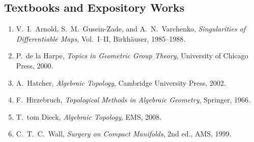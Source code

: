 \subsection*{Textbooks and Expository Works}
\begin{enumerate}
    \item V.\ I.\ Arnold, S.\ M.\ Gusein-Zade, and A.\ N.\ Varchenko, \textit{Singularities of Differentiable Maps}, Vol.\ I--II, Birkh\"auser, 1985--1988.
    \item P.\ de la Harpe, \textit{Topics in Geometric Group Theory}, University of Chicago Press, 2000.
    \item A.\ Hatcher, \textit{Algebraic Topology}, Cambridge University Press, 2002.
    \item F.\ Hirzebruch, \textit{Topological Methods in Algebraic Geometry}, Springer, 1966.
    \item T.\ tom Dieck, \textit{Algebraic Topology}, EMS, 2008.
    \item C.\ T.\ C.\ Wall, \textit{Surgery on Compact Manifolds}, 2nd ed., AMS, 1999.
\end{enumerate}

